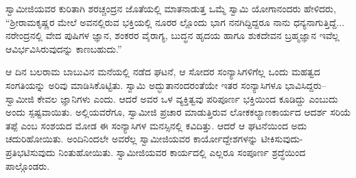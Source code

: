 ಸ್ವಾಮೀಜಿಯವರ ಕುರಿತಾಗಿ ಶರಚ್ಚಂದ್ರನ ಜೊತೆಯಲ್ಲಿ ಮಾತನಾಡುತ್ತ ಒಮ್ಮೆ ಸ್ವಾಮಿ ಯೋಗಾನಂದರು ಹೇಳಿದರು, “ಶ್ರೀರಾಮಕೃಷ್ಣರ ಮೇಲೆ ಅವನಲ್ಲಿರುವ ಭಕ್ತಿಯಲ್ಲಿ ನೂರರ ಲ್ಲೊಂದು ಭಾಗ ನನಗಿದ್ದಿದ್ದರೂ ನಾನು ಧನ್ಯನಾಗುತ್ತಿದ್ದೆ... ನರೇಂದ್ರನಲ್ಲಿ ವೇದ ಪುಷಿಗಳ ಜ್ಞಾನ, ಶಂಕರರ ವೈರಾಗ್ಯ, ಬುದ್ಧನ ಹೃದಯ ಹಾಗೂ ಶುಕದೇವನ ಬ್ರಹ್ಮಜ್ಞಾನ ಇವೆಲ್ಲ ಆವಿರ್ಭವಿಸಿರುವುದನ್ನು ಕಾಣಬಹುದು.”

ಆ ದಿನ ಬಲರಾಮ ಬಾಬುವಿನ ಮನೆಯಲ್ಲಿ ನಡೆದ ಘಟನೆ, ಆ ಸೋದರ ಸಂನ್ಯಾಸಿಗಳಿಗೆಲ್ಲ ಒಂದು ಮಹತ್ವದ ಸಂಗತಿಯನ್ನು ಅರಿವು ಮಾಡಿಸಿಕೊಟ್ಟಿತು. ಸ್ವಾಮಿ ಅದ್ಭುತಾನಂದರಂತೆಯೇ ಇತರ ಸಂನ್ಯಾಸಿಗಳೂ ಭಾವಿಸಿದ್ದರು–ಸ್ವಾಮೀಜಿ ಕೇವಲ ಜ್ಞಾನಿಗಳು ಎಂದು. ಆದರೆ ಅವರ ಒಳ ವ್ಯಕ್ತಿತ್ವವು ಪರಿಪೂರ್ಣ ಭಕ್ತಿಯಿಂದ ಕೂಡಿದ್ದು ಎಂಬುದು ಅಂದು ಸ್ಪಷ್ಟವಾಯಿತು. ಅಲ್ಲಿಯವರೆಗೂ, ಸ್ವಾಮೀಜಿ ಪ್ರಚಾರ ಮಾಡುತ್ತಿರುವ ಲೋಕಕಲ್ಯಾಣಕಾರ್ಯದ ಆದರ್ಶ ಸರಿಯೆ ತಪ್ಪೆ ಎಂಬ ಸಂಶಯದ ಮೋಡ ಈ ಸಂನ್ಯಾಸಿಗಳ ಮನಸ್ಸಿನಲ್ಲಿ ಕವಿದಿತ್ತು. ಆದರೆ ಆ ಘಟನೆಯಿಂದ ಅದು ಚದುರಿಹೋಯಿತು. ಅಂದಿನಿಂದಲೇ ಅವರೆಲ್ಲ ಸ್ವಾಮೀಜಿಯವರ ಕಾರ್ಯೋದ್ದೇಶಗಳನ್ನು ಟೀಕಿಸುವುದು-ಪ್ರತಿಭಟಿಸುವುದು ನಿಂತುಹೋಯಿತು. ಸ್ವಾಮೀಜಿಯವರ ಕಾರ್ಯದಲ್ಲಿ ಎಲ್ಲರೂ ಸಂಪೂರ್ಣ ಶ್ರದ್ಧೆಯಿಂದ ಪಾಲ್ಗೊಂಡರು.

